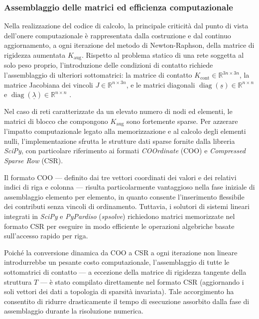\subsubsection{Assemblaggio delle matrici ed efficienza computazionale}
Nella realizzazione del codice di calcolo, la principale criticità dal punto di vista dell'onere computazionale è rappresentata dalla costruzione e dal continuo aggiornamento, a ogni iterazione del metodo di Newton-Raphson, della matrice di rigidezza aumentata $K_{\text{aug}}$. Rispetto al problema statico di una rete soggetta al solo peso proprio, l'introduzione delle condizioni di contatto richiede l'assemblaggio di ulteriori sottomatrici: la matrice di contatto ${K}_{\text{cont}} \in \mathbb{R}^{3n \times 3n}$, la matrice Jacobiana dei vincoli $J \in \mathbb{R}^{n \times 3n}$, e le matrici diagonali $\operatorname{diag}(\underline{s}) \in \mathbb{R}^{n\times n}$ e $\operatorname{diag}(\underline{\lambda}) \in \mathbb{R}^{n\times n}$ .

Nel caso di reti caratterizzate da un elevato numero di nodi ed elementi, le matrici di blocco che compongono $K_{\text{aug}}$ sono fortemente sparse. Per azzerare l'impatto computazionale legato alla memorizzazione e al calcolo degli elementi nulli, l'implementazione sfrutta le strutture dati sparse fornite dalla libreria \textit{SciPy}, con particolare riferimento ai formati \textit{COOrdinate} (COO) e \textit{Compressed Sparse Row} (CSR).

Il formato COO — definito dai tre vettori coordinati dei valori e dei relativi indici di riga e colonna — risulta particolarmente vantaggioso nella fase iniziale di assemblaggio elemento per elemento, in quanto consente l'inserimento flessibile dei contributi senza vincoli di ordinamento. Tuttavia, i solutori di sistemi lineari integrati in \textit{SciPy} e \textit{PyPardiso} (\textit{spsolve}) richiedono matrici memorizzate nel formato CSR per eseguire in modo efficiente le operazioni algebriche basate sull'accesso rapido per riga. 

Poiché la conversione dinamica da COO a CSR a ogni iterazione non lineare introdurrebbe un pesante costo computazionale, l'assemblaggio di tutte le sottomatrici di contatto — a eccezione della matrice di rigidezza tangente della struttura $T$ — è stato compilato direttamente nel formato CSR (aggiornando i soli vettori dei dati a topologia di sparsità invariata). Tale accorgimento ha consentito di ridurre drasticamente il tempo di esecuzione assorbito dalla fase di assemblaggio durante la risoluzione numerica.

